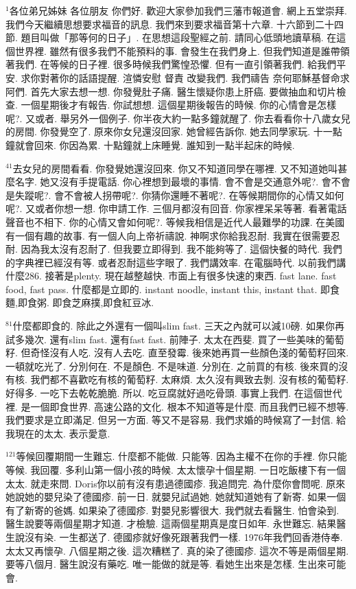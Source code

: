 \documentclass{book}
\begin{document}
$^{1}$各位弟兄姊妹 各位朋友 你們好.
歡迎大家參加我們三藩市報道會.
網上五堂崇拜.
我們今天繼續思想要求福音的訊息.
我們來到要求福音第十六章.
十六節到二十四節.
題目叫做「那等何的日子」.
在思想這段聖經之前.
請同心低頭地讀草稿.
在這個世界裡.
雖然有很多我們不能預料的事.
會發生在我們身上.
但我們知道是誰帶領著我們.
在等候的日子裡.
很多時候我們驚惶恐懼.
但有一直引領著我們.
給我們平安.
求你對著你的話語提醒.
渲憐安慰 督責 改變我們.
我們禱告 奈何耶穌基督命求 阿們.
首先大家去想一想.
你發覺肚子痛.
醫生懷疑你患上肝癌.
要做抽血和切片檢查.
一個星期後才有報告.
你試想想.
這個星期後報告的時候.
你的心情會是怎樣呢?.
又或者.
舉另外一個例子.
你半夜大約一點多鐘就醒了.
你去看看你十八歲女兒的房間.
你發覺空了.
原來你女兒還沒回家.
她曾經告訴你.
她去同學家玩.
十一點鐘就會回來.
你因為累.
十點鐘就上床睡覺.
誰知到一點半起床的時候.

$^{41}$去女兒的房間看看.
你發覺她還沒回來.
你又不知道同學在哪裡.
又不知道她叫甚麼名字.
她又沒有手提電話.
你心裡想到最壞的事情.
會不會是交通意外呢?.
會不會是失蹤呢?.
會不會被人拐帶呢?.
你猜你還睡不著呢?.
在等候期間你的心情又如何呢?.
又或者你想一想.
你申請工作.
三個月都沒有回音.
你家裡呆呆等著.
看著電話聲音也不相下.
你的心情又會如何呢?.
等候我相信是近代人最難學的功課.
在美國有一個有趣的故事.
有一個人向上帝祈禱說.
神啊求你給我忍耐.
我實在很需要忍耐.
因為我太沒有忍耐了.
但我要立即得到.
我不能夠等了.
這個快餐的時代.
我們的字典裡已經沒有等.
或者忍耐這些字眼了.
我們講效率.
在電腦時代.
以前我們講什麼286.
接著是plenty.
現在越整越快.
市面上有很多快速的東西.
fast lane.
fast food, fast pass.
什麼都是立即的.
instant noodle, instant this, instant that.
即食麵,即食粥.
即食芝麻撲,即食紅豆冰.

$^{81}$什麼都即食的.
除此之外還有一個叫slim fast.
三天之內就可以減10磅.
如果你再試多幾次.
還有slim fast.
還有fast fast.
前陣子.
太太在西斐.
買了一些美味的葡萄籽.
但奇怪沒有人吃.
沒有人去吃.
直至發霉.
後來她再買一些顏色淺的葡萄籽回來.
一頓就吃光了.
分別何在.
不是顏色.
不是味道.
分別在.
之前買的有核.
後來買的沒有核.
我們都不喜歡吃有核的葡萄籽.
太麻煩.
太久沒有興致去剝.
沒有核的葡萄籽.
好得多.
一吃下去乾乾脆脆.
所以.
吃豆腐就好過吃骨頭.
事實上我們.
在這個世代裡.
是一個即食世界.
高速公路的文化.
根本不知道等是什麼.
而且我們已經不想等.
我們要求是立即滿足.
但另一方面.
等又不是容易.
我們求婚的時候寫了一封信.
給我現在的太太.
表示愛意.

$^{121}$等候回覆期間一生難忘.
什麼都不能做.
只能等.
因為主權不在你的手裡.
你只能等候.
我回覆.
多利山第一個小孩的時候.
太太懷孕十個星期.
一日吃飯樓下有一個太太.
就走來問.
Doris你以前有沒有患過德國疹.
我追問完.
為什麼你會問呢.
原來她說她的嬰兒染了德國疹.
前一日.
就嬰兒試過她.
她就知道她有了新寄.
如果一個有了新寄的爸媽.
如果染了德國疹.
對嬰兒影響很大.
我們就去看醫生.
怕會染到.
醫生說要等兩個星期才知道.
才檢驗.
這兩個星期真是度日如年.
永世難忘.
結果醫生說沒有染.
一生都送了.
德國疹就好像死跟著我們一樣.
1976年我們回香港侍奉.
太太又再懷孕.
八個星期之後.
這次糟糕了.
真的染了德國疹.
這次不等是兩個星期.
要等八個月.
醫生說沒有藥吃.
唯一能做的就是等.
看她生出來是怎樣.
生出來可能會.
\end{document}
